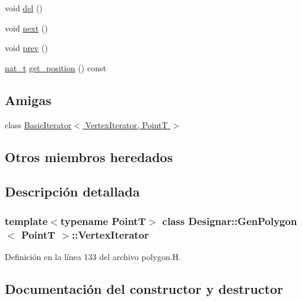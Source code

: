 \begin{DoxyCompactItemize}
\item 
void \hyperlink{class_designar_1_1_gen_polygon_1_1_vertex_iterator_a6e906d0fb0472f35e11bcc7ec7faa9e7}{del} ()
\item 
void \hyperlink{class_designar_1_1_gen_polygon_1_1_vertex_iterator_a85d990ecb087c96de85b6743d0e2ab0b}{next} ()
\item 
void \hyperlink{class_designar_1_1_gen_polygon_1_1_vertex_iterator_ade90ad67041eff5d563f2afcad38acd1}{prev} ()
\item 
\hyperlink{namespace_designar_aa72662848b9f4815e7bf31a7cf3e33d1}{nat\+\_\+t} \hyperlink{class_designar_1_1_gen_polygon_1_1_vertex_iterator_a44f1777dd9aa54546cd497500a5232fb}{get\+\_\+position} () const
\end{DoxyCompactItemize}
\subsection*{Amigas}
\begin{DoxyCompactItemize}
\item 
class \hyperlink{class_designar_1_1_gen_polygon_1_1_vertex_iterator_a580630487e8bbe9b1152cc636325bee6}{Basic\+Iterator$<$ Vertex\+Iterator, Point\+T $>$}
\end{DoxyCompactItemize}
\subsection*{Otros miembros heredados}


\subsection{Descripción detallada}
\subsubsection*{template$<$typename PointT$>$\newline
class Designar\+::\+Gen\+Polygon$<$ Point\+T $>$\+::\+Vertex\+Iterator}



Definición en la línea 133 del archivo polygon.\+H.



\subsection{Documentación del constructor y destructor}
\mbox{\label{class_designar_1_1_gen_polygon_1_1_vertex_iterator_af12ab8f901a5d0fe153a8a5ce8fd9639}} 
